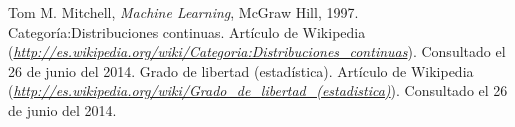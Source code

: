 
\begin{thebibliography}{99}
 Tom M. Mitchell, \textit{Machine Learning}, McGraw Hill, 1997.
 Categoría:Distribuciones continuas. Artículo de Wikipedia ({\it \url{http://es.wikipedia.org/wiki/Categoria:Distribuciones_continuas}}). Consultado el 26 de junio del 2014.
 Grado de libertad (estadística). Artículo de Wikipedia ({\it \url{http://es.wikipedia.org/wiki/Grado\_de\_libertad\_(estadistica)}}). Consultado el 26 de junio del 2014.
\end{thebibliography}
